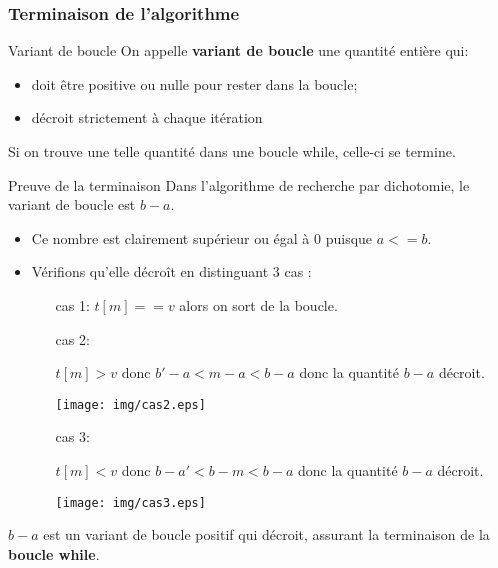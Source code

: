 \documentclass[9pt]{beamer}
\newcounter{num}
\begin{document}
\begin{frame}
\frametitle{Terminaison de l'algorithme}

\begin{block}{Variant de boucle}
On appelle \textbf{variant de boucle} une quantité entière qui:
\begin{itemize}
\item doit être positive ou nulle pour rester dans la boucle;
\item décroit strictement à chaque itération
\end{itemize}
Si on trouve une telle quantité dans une boucle while, celle-ci se termine.
\end{block}

\begin{block}{Preuve de la terminaison}
Dans l'algorithme de recherche par dichotomie, le variant de boucle est $b-a$.
\begin{itemize}
\item Ce nombre est clairement supérieur ou égal à 0 puisque $a<=b$.
\item Vérifions qu'elle décroît en distinguant 3 cas :
\begin{enumerate}
\item[cas 1:] $t[m]==v$ alors on sort de la boucle. \medskip
\item[cas 2:] \begin{minipage}{6cm}
$t[m]>v$ donc $b'-a < m-a < b-a$ donc la quantité $b-a$ décroit.
\end{minipage}\hfill
\begin{minipage}{3.5cm}
\texttt{[image: img/cas2.eps]}
\end{minipage}\medskip
\item[cas 3:] \begin{minipage}{6cm}
$t[m]<v$ donc $b-a' < b-m < b-a$ donc la quantité $b-a$ décroit.
\end{minipage}\hfill
\begin{minipage}{3.5cm}
\texttt{[image: img/cas3.eps]}
\end{minipage}
\end{enumerate}
\end{itemize}
$b-a$ est un variant de boucle positif qui décroit, assurant la terminaison de la \textbf{boucle while}.
\end{block}
\end{frame}
\end{document}
